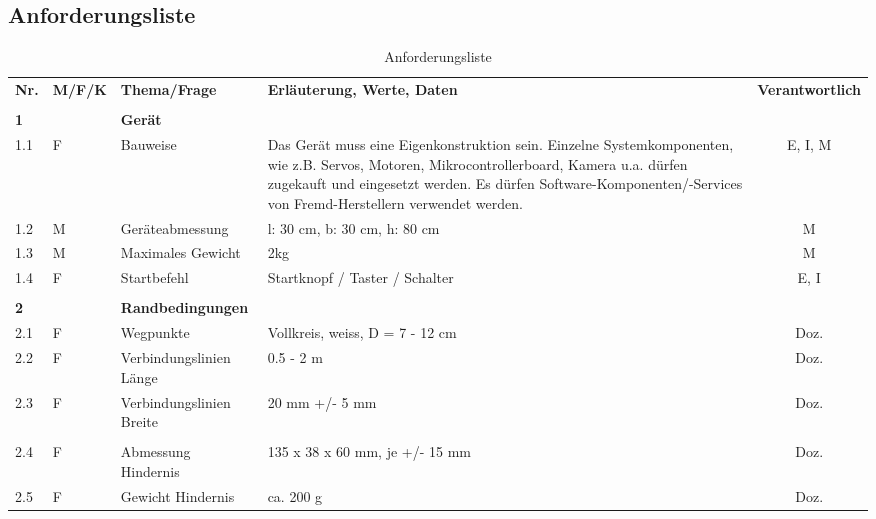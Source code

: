 \documentclass{article}
\begin{document}
\begin{landscape} %
    \section{Anforderungsliste}
    \begin{table}[H] %
        \centering
        \begin{tabular}{llp{4cm}p{15cm}c}
            \textbf{Nr.} & \textbf{M/F/K} & \textbf{Thema/Frage} & \textbf{Erläuterung, Werte, Daten} & \textbf{Verantwortlich} \\
            \\
            \textbf{1} &  & \textbf{Gerät} & &   \\
            1.1 & F & Bauweise & Das Gerät muss eine Eigenkonstruktion sein. Einzelne Systemkomponenten, wie z.B. Servos,
            Motoren, Mikrocontrollerboard, Kamera u.a. dürfen zugekauft und eingesetzt werden. Es
            dürfen Software-Komponenten/-Services von Fremd-Herstellern verwendet werden. & E, I, M  \\ 
            1.2 & M & Geräteabmessung & l: 30 cm, b: 30 cm, h: 80 cm & M \\
            1.3 & M & Maximales Gewicht & 2kg & M \\
            1.4 & F & Startbefehl & Startknopf / Taster / Schalter & E, I \\
            \\
            \textbf{2} & & \textbf{Randbedingungen} \\
            2.1 & F & Wegpunkte & Vollkreis, weiss, D = 7 - 12 cm & Doz. \\
            2.2 & F & Verbindungslinien Länge & 0.5 - 2 m & Doz. \\
            2.3 & F & Verbindungslinien Breite & 20 mm +/- 5 mm & Doz. \\
            \\
            2.4 & F & Abmessung Hindernis & 135 x 38 x 60 mm, je +/- 15 mm & Doz. \\
            2.5 & F & Gewicht Hindernis & ca. 200 g & Doz. \\
        \end{tabular}
        \caption{Anforderungsliste}
        \label{tab:my_label}
    \end{table}
\end{landscape} %
\end{document}
